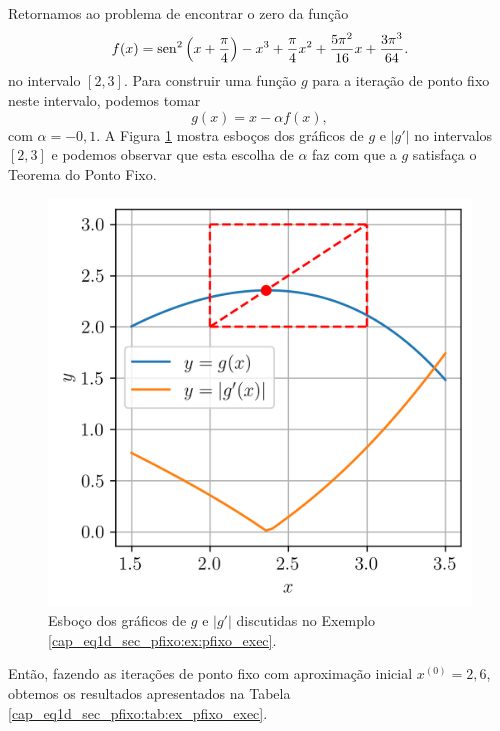 \begin{ex}\label{cap_eq1d_sec_pfixo:ex:pfixo_exec}
  Retornamos ao problema de encontrar o zero da função
  \begin{equation}
    f(x) = \operatorname{sen}^2\left(x+\frac{\pi}{4}\right) - x^3 + \frac{\pi}{4}x^2 + \frac{5\pi^2}{16}x + \frac{3\pi^3}{64}.
  \end{equation}
  no intervalo $[2,3]$. Para construir uma função $g$ para a iteração de ponto fixo neste intervalo, podemos tomar
  \begin{equation}
    g(x) = x - \alpha f(x),
  \end{equation}
com $\alpha = -0,1$. A Figura \ref{cap_eq1d_sec_pfixo:fig:ex_pfixo_exec} mostra esboços dos gráficos de $g$ e $|g'|$ no intervalos $[2, 3]$ e podemos observar que esta escolha de $\alpha$ faz com que a $g$ satisfaça o Teorema do Ponto Fixo.

\begin{figure}[H]
  \centering
  \includegraphics[width=\textwidth]{./cap_eq1d/dados/fig_ex_pfixo_exec/fig}
  \caption{Esboço dos gráficos de $g$ e $|g'|$ discutidas no Exemplo \ref{cap_eq1d_sec_pfixo:ex:pfixo_exec}.}
  \label{cap_eq1d_sec_pfixo:fig:ex_pfixo_exec}
\end{figure}

Então, fazendo as iterações de ponto fixo com aproximação inicial $x^{(0)}=2,6$, obtemos os resultados apresentados na Tabela \ref{cap_eq1d_sec_pfixo:tab:ex_pfixo_exec}.


\end{ex}
